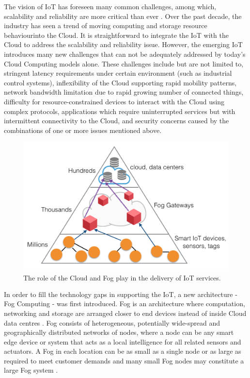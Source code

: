 The vision of IoT has foreseen many common challenges, among which, scalability and reliability are more critical than ever \autocite{Atzori20102787, 7123563, 8058399}. Over the past decade, the industry has seen a trend of moving computing and storage resource behaviourinto the Cloud. It is straightforward to integrate the IoT with the Cloud to address the scalability and reliability issue. However, the emerging IoT introduces many new challenges that can not be adequately addressed by today's Cloud Computing models alone. These challenges \autocite{7498684, 7033259} include but are not limited to, stringent latency requirements under certain environment (such as industrial control systems), inflexibility of the Cloud supporting rapid mobility patterns, network bandwidth limitation due to rapid growing number of connected things, difficulty for resource-constrained devices to interact with the Cloud using complex protocols, applications which require uninterrupted services but with intermittent connectivity to the Cloud, and security concerns caused by the combinations of one or more issues mentioned above.

\begin{figure}[!htbp]
\centering
\includegraphics[scale = 0.55]{Fog_computing.png}
\caption[The role of the Cloud and Fog play in the delivery of IoT services]{The role of the Cloud and Fog play in the delivery of IoT services. \autocite{7123563}} 
\label{fig:Fog_computing}
\end{figure}

In order to fill the technology gaps in supporting the IoT, a new architecture - Fog Computing - was first introduced. Fog is an architecture where computation, networking and storage are arranged closer to end devices instead of inside Cloud data centres \autocite{Bonomi:2012:FCR:2342509.2342513}. Fog consists of heterogeneous, potentially wide-spread and geographically distributed networks of nodes, where a node can be any smart edge device or system that acts as a local intelligence for all related sensors and actuators. A Fog in each location can be as small as a single node or as large as required to meet customer demands and many small Fog nodes may constitute a large Fog system \autocite{7498684}. 


